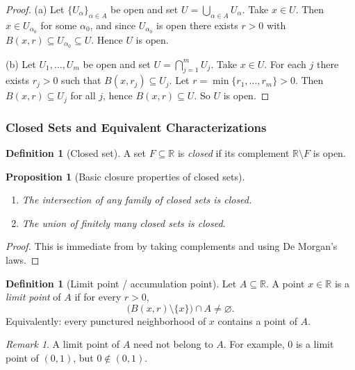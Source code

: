\documentclass[12pt]{article}
\numberwithin{equation}{section}
\newcommand{\RR}{\mathbb{R}}
\let\emptyset\varnothing
\theoremstyle{plain}
\newtheorem{proposition}[theorem]{Proposition}
\theoremstyle{definition}
\newtheorem{definition}[theorem]{Definition}
\theoremstyle{remark}
\newtheorem{remark}[theorem]{Remark}
\begin{document}
\begin{proof}
(a) Let $\{U_\alpha\}_{\alpha\in A}$ be open and set $U=\bigcup_{\alpha\in A}U_\alpha$.
Take $x\in U$. Then $x\in U_{\alpha_0}$ for some $\alpha_0$, and since $U_{\alpha_0}$ is open there exists $r>0$ with
$B(x,r)\subseteq U_{\alpha_0}\subseteq U$. Hence $U$ is open.

(b) Let $U_1,\dots,U_m$ be open and set $U=\bigcap_{j=1}^m U_j$.
Take $x\in U$. For each $j$ there exists $r_j>0$ such that $B(x,r_j)\subseteq U_j$.
Let $r=\min\{r_1,\dots,r_m\}>0$. Then $B(x,r)\subseteq U_j$ for all $j$, hence $B(x,r)\subseteq U$.
So $U$ is open.
\end{proof}

\subsubsection{Closed Sets and Equivalent Characterizations}

\begin{definition}[Closed set]\label{def:closed-set}
A set $F\subseteq \RR$ is \emph{closed} if its complement $\RR\setminus F$ is open.
\end{definition}

\begin{proposition}[Basic closure properties of closed sets]\label{prop:closed-ops}
\begin{enumerate}[label=(\alph*)]
\item The intersection of any family of closed sets is closed.
\item The union of finitely many closed sets is closed.
\end{enumerate}
\end{proposition}

\begin{proof}
This is immediate from  by taking complements and using De Morgan's laws.
\end{proof}

\begin{definition}[Limit point / accumulation point]\label{def:limit-point-set}
Let $A\subseteq\RR$. A point $x\in\RR$ is a \emph{limit point} of $A$ if for every $r>0$,
\[
\bigl(B(x,r)\setminus\{x\}\bigr)\cap A \neq \emptyset.
\]
Equivalently: every punctured neighborhood of $x$ contains a point of $A$.
\end{definition}

\begin{remark}
A limit point of $A$ need not belong to $A$.
For example, $0$ is a limit point of $(0,1)$, but $0\notin (0,1)$.
\end{remark}
\end{document}
